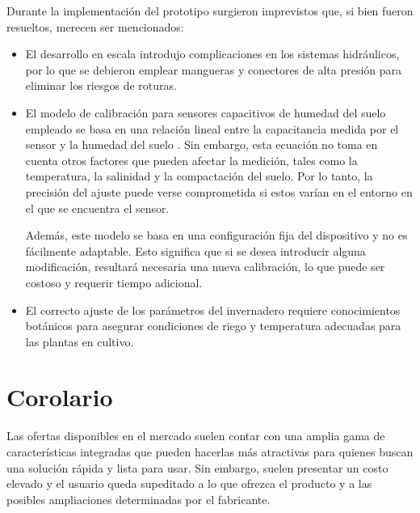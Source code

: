 Durante la implementación del prototipo surgieron imprevistos que, si bien fueron resueltos, merecen ser mencionados:
\begin{itemize}
\item El desarrollo en escala introdujo complicaciones en los sistemas hidráulicos, por lo que se debieron emplear mangueras y conectores de alta presión para eliminar los riesgos de roturas.

\item El modelo de calibración para sensores capacitivos de humedad del suelo empleado se basa en una relación lineal entre la capacitancia medida por el sensor y la humedad del suelo \citep{soilcalibration}. Sin embargo, esta ecuación no toma en cuenta otros factores que pueden afectar la medición, tales como la temperatura, la salinidad y la compactación del suelo. Por lo tanto, la precisión del ajuste puede verse comprometida si estos varían en el entorno en el que se encuentra el sensor.

Además, este modelo se basa en una configuración fija del dispositivo y no es fácilmente adaptable. Esto significa que si se desea introducir alguna modificación, resultará necesaria una nueva calibración, lo que puede ser costoso y requerir tiempo adicional.

\item El correcto ajuste de los parámetros del invernadero requiere conocimientos botánicos para asegurar condiciones de riego y temperatura adecuadas para las plantas en cultivo. 
\end{itemize}


\section{Corolario}
Las ofertas disponibles en el mercado suelen contar con una amplia gama de características integradas que pueden hacerlas más atractivas para quienes buscan una solución rápida y lista para usar. Sin embargo, suelen presentar un costo elevado y el usuario queda supeditado a lo que ofrezca el producto y a las posibles ampliaciones determinadas por el fabricante.


